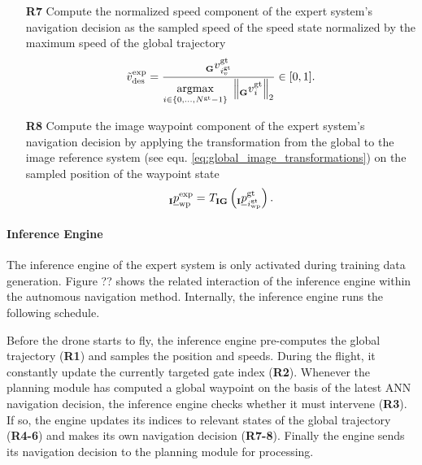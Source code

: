\begin{itemize}
    


    \item [\textbf{R7}] Compute the normalized speed component
    of the expert system's navigation decision
    as the sampled speed of the speed state
    normalized by the maximum speed of the global trajectory
    \begin{equation}
        \speed[\norm]{\expert}{\desired}{}{}
        = 
        \frac{
            \speed[]{\glotraj}{\idx[]{\glotraj}{v}{}{}}{\grs}{}
        }
        {
            \argmax{i \in \{0, ..., \num[]{\glotraj}{}{}{} - 1\}}
            \left\| 
                \speed[]{\glotraj}{\idx[]{}{}{}{}}{\grs}{}
            \right\|_2
        }  
        \in [0,1].
    \end{equation}


    
    
    
    \item [\textbf{R8}] Compute the image waypoint component
    of the expert system's navigation decision
    by applying the transformation
    from the global to the image reference system (see equ. \ref{eq:global_image_transformations})
    on the sampled position of the waypoint state 
    \begin{equation}
        \pos[]{\expert}{\wayp}{\irs}{}
        =
        \trafo[]{}{\irs\grs}{}{} \left(
            \pos[]{\glotraj}{\idx[]{\glotraj}{\wayp}{}{}}{\irs}{}
        \right)
        .
    \end{equation}

\end{itemize}





\paragraph*{Inference Engine} $\ $\\
The inference engine of the expert system is only activated 
during training data generation.
Figure ?? shows the related interaction of the inference engine 
within the autnomous navigation method.
Internally, the inference engine runs the following schedule.

Before the drone starts to fly,
the inference engine pre-computes the global trajectory (\textbf{R1})
and samples the position and speeds.
During the flight, it constantly update the currently targeted
gate index (\textbf{R2}).
Whenever the planning module has computed a global waypoint on the basis
of the latest ANN navigation decision,
the inference engine checks whether it must intervene (\textbf{R3}).
If so, the engine updates its indices to relevant states of the global trajectory
(\textbf{R4-6})
and makes its own navigation decision (\textbf{R7-8}).
Finally the engine sends its navigation decision to the planning module for processing.





